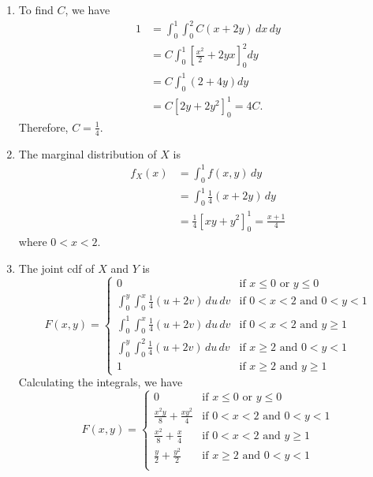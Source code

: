 \documentclass[12pt]{article}
\newenvironment{problem}[2][Problem]{\begin{trivlist}
\item[\hskip \labelsep {\bfseries #1}\hskip \labelsep {\bfseries #2.}]}
{\end{trivlist}}
\begin{document}
\begin{problem}{5}
\begin{itemize}
    \begin{enumerate}
      \item To find $C$, we have
      \begin{align*}
        1 &= \int_0^1 \int_0^2 C(x + 2y) \, dx \, dy \\
        &= C \int_0^1 \left[ \frac{x^2}{2} + 2yx \right]_{0}^{2} dy \\
        &= C \int_0^1 (2 + 4y) dy \\
        &= C \left[ 2y + 2y^2 \right]_{0}^{1} = 4C.
      \end{align*}
      Therefore, $C = \frac{1}{4}$.
      \item The marginal distribution of $X$ is
      \begin{align*}
        f_X (x) &= \int_0^1 f(x,y) \, dy \\
        &= \int_0^1 \frac{1}{4} (x + 2y) \, dy \\
        &= \frac{1}{4} \left[ xy + y^2 \right]_{0}^{1} = 
        \frac{x + 1}{4}
      \end{align*}
      where $0 < x < 2$.
      \item The joint cdf of $X$ and $Y$ is
      \[
        F(x,y) = \begin{cases}
          0 & \text{if } x \le 0 \text{ or } y \le 0 \\
          \int_0^y \int_0^x \frac{1}{4} (u + 2v) \, du \, dv & 
          \text{if } 0 < x < 2 \text{ and } 0 < y < 1 \\
          \int_0^1 \int_0^x \frac{1}{4} (u + 2v) \, du \, dv & 
          \text{if } 0 < x < 2 \text{ and } y \ge 1 \\
          \int_0^y \int_0^2 \frac{1}{4} (u + 2v) \, du \, dv & 
          \text{if } x \ge 2 \text{ and } 0 < y < 1 \\
          1 & \text{if } x \ge 2 \text{ and } y \ge 1
        \end{cases}
      \]
      Calculating the integrals, we have
      \[
        F(x,y) = \begin{cases}
          0 & \text{if } x \le 0 \text{ or } y \le 0 \\
          \frac{x^2y}{8} + \frac{xy^2}{4} & 
          \text{if } 0 < x < 2 \text{ and } 0 < y < 1 \\
          \frac{x^2}{8} + \frac{x}{4} & 
          \text{if } 0 < x < 2 \text{ and } y \ge 1 \\
          \frac{y}{2} + \frac{y^2}{2} & 
          \text{if } x \ge 2 \text{ and } 0 < y < 1 \\

\end{cases}\]
\end{enumerate}
\end{itemize}
\end{problem}
\end{document}
